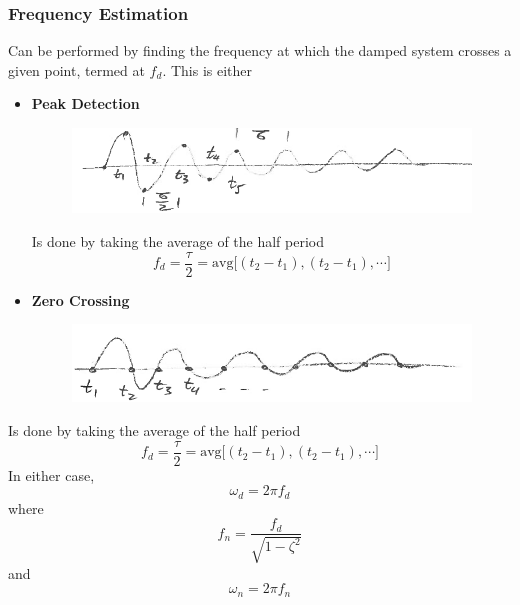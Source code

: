 \documentclass[12pt,letter]{article}
\numberwithin{ex}{section} %
\numberwithin{re}{section} %
\numberwithin{equation}{section}	%
\begin{document}
\subsubsection{Frequency Estimation} Can be performed by finding the frequency at which the damped system crosses a given point, termed at $f_d$. This is either
\begin{itemize}
\item \textbf{Peak Detection} 
			\begin{figure}[H]
				\centering
				\includegraphics[width=5in]{../figures/peak_detection.png}
			\end{figure}	
Is done by taking the average of the half period
\begin{equation}
f_d = \frac{\tau}{2} = \text{avg}\big[ (t_2-t_1), (t_2-t_1), \cdots \big]
\end{equation}
\item \textbf{Zero Crossing} 
			\begin{figure}[H]
				\centering
				\includegraphics[width=5in]{../figures/zero_crossing.png}
			\end{figure}
\end{itemize}	
Is done by taking the average of the half period
\begin{equation}
f_d = \frac{\tau}{2} = \text{avg}\big[ (t_2-t_1), (t_2-t_1), \cdots \big]
\end{equation}
In either case, 
\begin{equation}
\omega_d = 2 \pi f_d
\end{equation}
where 
\begin{equation}
f_n = \frac{f_d}{\sqrt{1-\zeta^2}}
\end{equation}
and
\begin{equation}
\omega_n = 2 \pi f_n
\end{equation}
\end{document}
